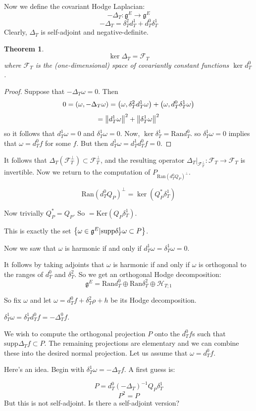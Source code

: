 \documentclass[11pt]{amsart}
\newtheorem{theorem}{Theorem}
\numberwithin{theorem}{subsection}
\numberwithin{lemma}{subsection}
\numberwithin{corollary}{subsection}
\numberwithin{definition}{subsection}
\numberwithin{prop}{subsection}
\newcommand{\supp}{\text{supp}}
\begin{document}
Now we define the covariant Hodge Laplacian:
\[-\Delta_T: \mathfrak{g}^E\to\mathfrak{g}^E\]
\[-\Delta_T= \delta_T^2 d_T^1 + d_T^0 \delta_T^1\]
Clearly, $\Delta_T$ is self-adjoint and negative-definite.
\begin{theorem}
\[\ker \Delta_T=\mathcal{F}_T\]
where $\mathcal{F}_T$ is the (one-dimensional) space of covariantly constant functions $\ker d_T^0$.
\end{theorem}
\begin{proof}
Suppose that $-\Delta_T\omega=0$.
Then 
\[0=\qty(\omega, -\Delta_T \omega) = \qty(\omega, \delta_T^2 d_T^1\omega) + \qty(\omega, d_T^0\delta_T^1\omega)\]
\[=\norm{d_T^1\omega}^2 + \norm{\delta_T^1\omega}^2\]
so it follows that $d_T^1\omega=0$ and $\delta_T^1\omega=0$.
Now, $\ker \delta_T^1 = \text{Ran}d_T^0$.
so $\delta_T^1\omega=0$ implies that $\omega=d_T^0f$ for some $f$. But then $d_T^1\omega=d_T^1d_T^0f=0$.
\end{proof}
It follows that $\Delta_T(\mathcal{F}_T^\perp)\subset \mathcal{F}_T^\perp$, 
and the resulting operator $\Delta_T|_{\mathcal{F}_T^\perp}:\mathcal{F}_T\to\mathcal{F}_T$ is invertible.
Now we return to the computation of $P_{\text{Ran}(d_T^0 Q_P)^\perp}$.

\[\text{Ran}(d_T^0 Q_P)^\perp = \ker(Q_P^\ast \delta_T^1)\]

Now trivially $Q_P^\ast =Q_P$. So $=\text{Ker}(Q_P\delta_T^1)$.

This is exactly the set $\qty{\omega\in \mathfrak{g}^E|\supp \delta_T^1 \omega\subset P}$.

Now we saw that $\omega$ is harmonic if and only if $d_T^1\omega=\delta_T^1\omega=0$.

It follows by taking adjoints that $\omega$ is harmonic if and only if $\omega$
is orthogonal to the ranges of $d_T^0$ and $\delta_T^2$. So we get an orthogonal Hodge decomposition:
\[\mathfrak{g}^E = \text{Ran}d_T^0 \oplus \text{Ran}\delta_T^2 \oplus \mathcal{H}_{T;1}\]

So fix $\omega$ and let $\omega = d_T^0f+\delta_T^2 \rho+h$ be its Hodge decomposition.

$\delta_T^1\omega = \delta_T^1d_T^0 f = -\Delta_T^0f$. 

We wish to compute the orthogonal projection $P$ onto the $d_T^0f$s such that $\supp \Delta_T f\subset P$.
The remaining projections are elementary and we can combine these into the desired normal projection.
Let us assume that $\omega = d_T^0 f$.

Here's an idea. Begin with $\delta_T^1 \omega = -\Delta_T f$.
A first guess is:

\[P=d_T^0(-\Delta_T)^{-1}Q_P \delta_T^1\]
\[P^2=P\]
But this is not self-adjoint. Is there a self-adjoint version?
\end{document}
